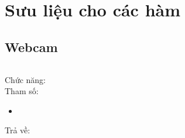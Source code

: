 \section{Sưu liệu cho các hàm}




\subsection{Webcam}


\begin{lstlisting}

\end{lstlisting}
Chức năng: \\
Tham số: 
\begin{itemize}
\item \lstinline{}
\end{itemize}
Trả về: 

\lstinline{}